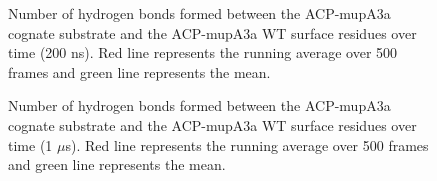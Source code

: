 \begin{singlespacing}
		\setlength\fboxsep{5pt}
		\setlength\fboxrule{1.5pt}
		\begin{figure}[htbp]
		\centering
		\caption[Number of hydrogen bonds formed between the ACP-mupA3a cognate substrate and the ACP-mupA3a WT surface residues over time (200 ns).]{Number of hydrogen bonds formed between the ACP-mupA3a cognate substrate and the ACP-mupA3a WT surface residues over time (200 ns).  Red line represents the running average over 500 frames and green line represents the mean.}
		\label{fig:HbondACPSPMWild200_protein}
		\end{figure}

		\setlength\fboxsep{5pt}
		\setlength\fboxrule{1.5pt}
		\begin{figure}[htbp]
		\centering
		\caption[Number of hydrogen bonds formed between the ACP-mupA3a cognate substrate and the ACP-mupA3a WT surface residues over time (1 $ \mu $s).]{Number of hydrogen bonds formed between the ACP-mupA3a cognate substrate and the ACP-mupA3a WT surface residues over time (1 $ \mu $s).  Red line represents the running average over 500 frames and green line represents the mean.}
		\label{fig:HbondACPSPMWild1000_protein}
		\end{figure}


\end{singlespacing}
